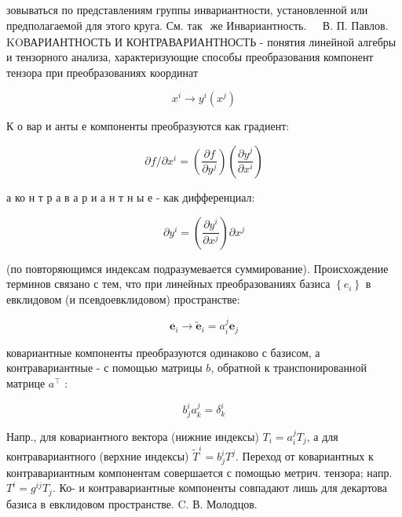 \documentclass[10pt]{article}
\begin{document}
зовываться по представлениям группы инвариантности, установленной или предполагаемой для этого круга. См. так$\begin{array}{ll}\text { же Инвариантность. } & \text { В. П. Павлов. }\end{array}$ KOВАРИАНТНОСТЬ И КОНТРАВАРИАНТНОСТЬ - понятия линейной алгебры и тензорного анализа, характеризующие способы преобразования компонент тензора при преобразованиях координат



\[

x^{i} \rightarrow y^{i}\left(x^{j}\right)

\]



К о вар и анты е компоненты преобразуются как градиент:



\[

\partial f / \partial x^{i}=\left(\frac{\partial f}{\partial y^{j}}\right)\left(\frac{\partial y^{j}}{\partial x^{i}}\right)

\]



а ко н т р а в а р и а н т н ы е - как дифференциал:



\[

\partial y^{i}=\left(\frac{\partial y^{i}}{\partial x^{j}}\right) \partial x^{j}

\]



(по повторяющимся индексам подразумевается суммирование). Происхождение терминов связано с тем, что при линейных преобразованиях базиса $\left\{e_{i}\right\}$ в евклидовом (и псевдоевклидовом) пространстве:



\[

\boldsymbol{e}_{i} \rightarrow \tilde{\boldsymbol{e}}_{i}=a_{i}^{j} \boldsymbol{e}_{j}

\]



ковариантные компоненты преобразуются одинаково с базисом, а контравариантные - с помощью матрицы $b$, обратной к транспонированной матрице $a^{\top}$ :



\[

b_{j}^{i} a_{k}^{j}=\delta_{k}^{i}

\]



Напр., для ковариантного вектора (нижние индексы) $T_{i}=a_{i}^{j} T_{j}$, а для контравариантного (верхние индексы) $\tilde{T}^{i}=b_{j}^{i} T^{j}$. Переход от ковариантных к контравариантным компонентам совершается с помощью метрич. тензора; напр. $T^{i}=g^{i j} T_{j}$. Ко- и контравариантные компоненты совпадают лишь для декартова базиса в евклидовом пространстве. C. В. Молодцов.
\end{document}
